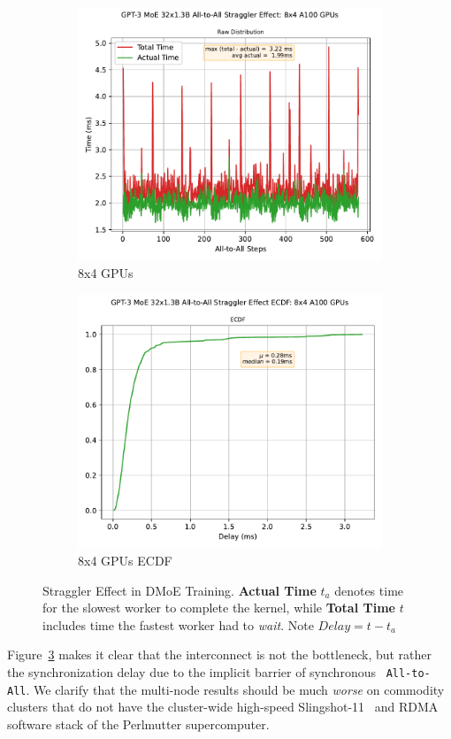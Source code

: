 \begin{figure}[!ht]
\begin{subfigure}{.5\linewidth}
        \centering
        \includegraphics[width=0.8\linewidth]{images/GPT-3_MoE_32x1.3B}
        \caption{8x4 GPUs}
        \label{sub:m_1.3}
    \end{subfigure}\hfill %
    \begin{subfigure}{.5\linewidth}
        \centering
        \includegraphics[width=0.8\linewidth, keepaspectratio]{images/GPT-3_MoE_32x1.3B_ecdf}
        \caption{8x4 GPUs ECDF}
        \label{sub:m_1.3_ecdf}
    \end{subfigure}
    \caption{\footnotesize Straggler Effect in DMoE Training.
    \textbf{Actual Time} $t_a$ denotes time for the slowest worker to complete the kernel,
        while \textbf{Total Time} $t$ includes time the fastest worker had to \emph{wait}. Note $Delay = t - t_a$}
    \label{fig:straggler}
\end{figure}

Figure~\ref{fig:straggler} makes it clear that the interconnect is not the bottleneck,
but rather the synchronization delay due to the implicit barrier of synchronous ~\verb|All-to-All|.
We clarify that the multi-node results should be much \emph{worse} on commodity clusters that do not
have the cluster-wide high-speed Slingshot-11~\cite{Khorassani2023} and RDMA software stack of the
Perlmutter supercomputer.
